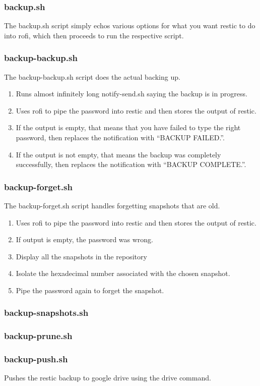 \documentclass[letterpaper,12pt]{article}
\begin{document}
\subsubsection{backup.sh}
\par The backup.sh script simply echos various options for what you want restic to do into rofi, which then proceeds to run the respective script.
\subsubsection{backup-backup.sh}
\par The backup-backup.sh script does the actual backing up.
\begin{enumerate}
	\item Runs almost infinitely long notify-send.sh saying the backup is in progress.
	\item Uses rofi to pipe the password into restic and then stores the output of restic.
	\item If the output is empty, that means that you have failed to type the right password, then replaces the notification with ``BACKUP FAILED.''.
	\item If the output is not empty, that means the backup was completely successfully, then replaces the notification with ``BACKUP COMPLETE.''.
\end{enumerate}
\subsubsection{backup-forget.sh}
\par The backup-forget.sh script handles forgetting snapshots that are old.
\begin{enumerate}
	\item Uses rofi to pipe the password into restic and then stores the output of restic.
	\item If output is empty, the password was wrong.
	\item Display all the snapshots in the repository
	\item Isolate the hexadecimal number associated with the chosen snapshot.
	\item Pipe the password again to forget the snapshot.
\end{enumerate}
\subsubsection{backup-snapshots.sh}
\subsubsection{backup-prune.sh}
\subsubsection{backup-push.sh}
\par Pushes the restic backup to google drive using the drive command.
\end{document}
